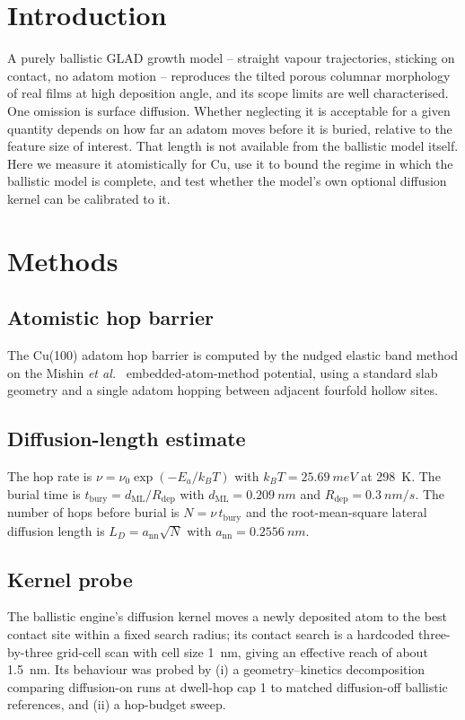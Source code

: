 \documentclass[aip,jcp,amsmath,amssymb,reprint]{revtex4-1}
\begin{document}
\section{Introduction}
\label{sec:intro}
A purely ballistic GLAD growth model -- straight vapour trajectories, sticking on
contact, no adatom motion -- reproduces the tilted porous columnar morphology of
real films at high deposition angle, and its scope limits are well characterised.
One omission is surface diffusion. Whether neglecting it is acceptable for a
given quantity depends on how far an adatom moves before it is buried, relative
to the feature size of interest. That length is not available from the ballistic
model itself. Here we measure it atomistically for Cu, use it to bound the
regime in which the ballistic model is complete, and test whether the model's
own optional diffusion kernel can be calibrated to it.

\section{Methods}
\label{sec:methods}

\subsection{Atomistic hop barrier}
The Cu(100) adatom hop barrier is computed by the nudged elastic band method on
the Mishin \textit{et al.}~\cite{mishin2001} embedded-atom-method potential, using a
standard slab geometry and a single adatom hopping between adjacent fourfold
hollow sites.

\subsection{Diffusion-length estimate}
The hop rate is $\nu = \nu_0 \exp(-E_a/k_BT)$ with $k_BT = \SI{25.69}{meV}$ at
\SI{298}{K}. The burial time is $t_\mathrm{bury} = d_\mathrm{ML}/R_\mathrm{dep}$
with $d_\mathrm{ML} = \SI{0.209}{nm}$ and $R_\mathrm{dep} = \SI{0.3}{nm/s}$. The
number of hops before burial is $N = \nu\,t_\mathrm{bury}$ and the
root-mean-square lateral diffusion length is
$L_D = a_\mathrm{nn}\sqrt{N}$ with $a_\mathrm{nn} = \SI{0.2556}{nm}$.

\subsection{Kernel probe}
The ballistic engine's diffusion kernel moves a newly deposited atom to the best
contact site within a fixed search radius; its contact search is a hardcoded
three-by-three grid-cell scan with cell size \SI{1}{nm}, giving an effective
reach of about \SI{1.5}{nm}. Its behaviour was probed by (i) a geometry--kinetics
decomposition comparing diffusion-on runs at dwell-hop cap 1 to matched
diffusion-off ballistic references, and (ii) a hop-budget sweep.
\end{document}
